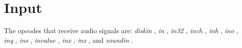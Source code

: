 \begin{comment}
\documentclass[10pt]{article}
\usepackage{fullpage, graphicx, url}
\setlength{\parskip}{1ex}
\setlength{\parindent}{0ex}
\title{Input}



\begin{tabular}{ccc}
The Alternative Csound Reference Manual & & \\
Previous &Signal Input and Output &Next

\end{tabular}

\end{comment}
\section{Input}


  The opcodes that receive audio signals are: \emph{diskin}
, \emph{in}
, \emph{in32}
, \emph{inch}
, \emph{inh}
, \emph{ino}
, \emph{inq}
, \emph{ins}
, \emph{invalue}
, \emph{inx}
, \emph{inz}
, and \emph{soundin}
. 


\begin{comment}
\begin{tabular}{lcr}
Previous &Home &Next \\
Signal Input and Output &Up &Output

\end{tabular}



\end{comment}
